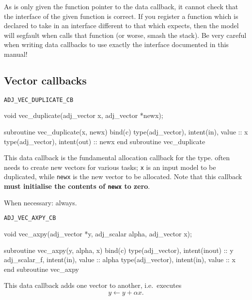 As \libadjoint is only given the function pointer to the data callback, it cannot check that the
interface of the given function is correct. If you register a function which is declared to take 
in an interface different to that which \libadjoint expects, then the model will segfault when
\libadjoint calls that function (or worse, smash the stack). Be very careful when writing data callbacks to use exactly
the interface documented in this manual!

\subsection{Vector callbacks} \label{sec:vector_callbacks}
\begin{boxwithtitle}{\texttt{ADJ_VEC_DUPLICATE_CB}}
\begin{minipage}{\columnwidth}
\begin{ccode}
  void vec_duplicate(adj_vector x, adj_vector *newx);
\end{ccode}
\begin{fortrancode}
  subroutine vec_duplicate(x, newx) bind(c)
    type(adj_vector), intent(in), value :: x
    type(adj_vector), intent(out) :: newx
  end subroutine vec_duplicate
\end{fortrancode}
\end{minipage}
\end{boxwithtitle}
This data callback is the fundamental allocation callback for the  type. \libadjoint
often needs to create new vectors for various tasks; \texttt{x} is an
input model  to be duplicated, while \texttt{newx} is the new vector
to be allocated. Note that this callback \textbf{must initialise the contents of \texttt{newx} to zero}.

When necessary: always.
\begin{boxwithtitle}{\texttt{ADJ_VEC_AXPY_CB}}
\begin{minipage}{\columnwidth}
\begin{ccode}
  void vec_axpy(adj_vector *y, adj_scalar alpha, adj_vector x);
\end{ccode}
\begin{fortrancode}
  subroutine vec_axpy(y, alpha, x) bind(c)
    type(adj_vector), intent(inout) :: y
    adj_scalar_f, intent(in), value :: alpha
    type(adj_vector), intent(in), value :: x
  end subroutine vec_axpy
\end{fortrancode}
\end{minipage}
\end{boxwithtitle}
This data callback adds one vector to another, i.e.\ executes
\begin{equation*}
y \leftarrow y + \alpha x.
\end{equation*}

